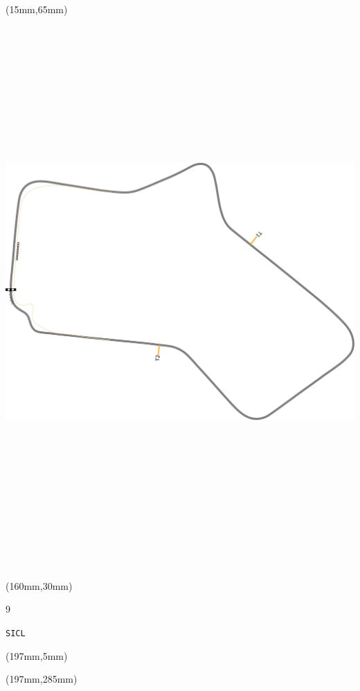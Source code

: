 \begin{textblock*}{185mm}(15mm,65mm)%
\centering
\mbox{\includegraphics[width=185mm,height=210mm,keepaspectratio]{PT/SICL.pdf}}
\end{textblock*}
\begin{textblock*}{40mm}(160mm,30mm)%
\Large
\par{} 
\par9 
\par\hfill\tiny\tt SICL\\
\end{textblock*}
\begin{textblock*}{20mm}(197mm,5mm)%
\fbox{\thepage}
\label{SICL}
\end{textblock*}
\begin{textblock*}{20mm}(197mm,285mm)%
\fbox{\thepage}
\end{textblock*}

